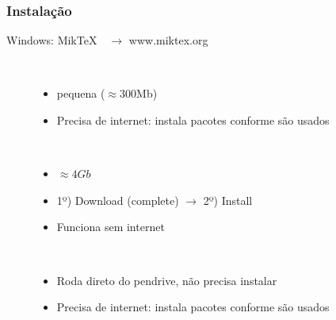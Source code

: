 \begin{frame}
  \frametitle{Instalação}

  \begin{block}{Windows: Mik\TeX $\quad\to$ www.miktex.org}
    \show\description
    \begin{description}
    \item[] \ 
      \begin{itemize}
      \item pequena ($\approx$300Mb)
      \item Precisa de internet: instala pacotes conforme são usados
      \end{itemize}
    \item[] \ 
      \begin{itemize}
      \item $\approx 4Gb$
      \item 1º) Download (complete) $\to$ 2º) Install
      \item Funciona sem internet
      \end{itemize}
    \item[] \ 
      \begin{itemize}
      \item Roda direto do pendrive, não precisa instalar
      \item Precisa de internet: instala pacotes conforme são usados
      \end{itemize}

    \end{description}
  \end{block}
  
\end{frame}

